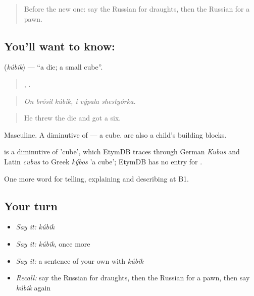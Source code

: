 \begin{quote}
Before the new one: say the Russian for draughts, then the Russian for a pawn.
\end{quote}

\subsection*{You'll want to know: }
\textbf{} (\emph{kúbik}) — \textquotedblleft{}a die; a small cube\textquotedblright{}.

\begin{quote}
  ,   .
\end{quote}

\begin{quote}
\emph{On brósil kúbik, i výpala shestyórka.}
\end{quote}

\begin{quote}
He threw the die and got a six.
\end{quote}

Masculine. A diminutive of \emph{} — a cube. \emph{} are also a child's building blocks.

\begin{cousinweb}
\emph{} is a diminutive of \emph{} 'cube', which EtymDB traces through German \emph{Kubus} and Latin \emph{cubus} to Greek \emph{kýbos} 'a cube'; EtymDB has no entry for \emph{}.
\end{cousinweb}

\begin{grammarlens}[title={What you've built}]
One more word for telling, explaining and describing at B1.
\end{grammarlens}

\subsection*{Your turn}
\begin{itemize}
\raggedright
  \item \emph{Say it:} \emph{kúbik}
  \item \emph{Say it:} \emph{kúbik}, once more
  \item \emph{Say it:} a sentence of your own with \emph{kúbik}
  \item \emph{Recall:} say the Russian for draughts, then the Russian for a pawn, then say \emph{kúbik} again
\end{itemize}

